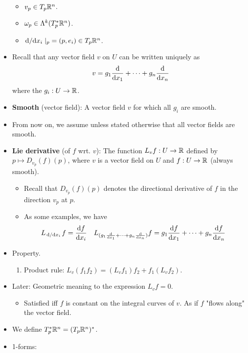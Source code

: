 \documentclass[../notes.tex]{subfiles}
\begin{document}
\begin{itemize}
\begin{itemize}
\begin{itemize}
        \end{itemize}
        \item $v_p\in T_p\R^n$.
        \item $\omega_p\in\lam[k]{T_p^*\R^n}$.
        \item $\dv*{x_i}|_p=(p,e_i)\in T_p\R^n$.
    \end{itemize}
    \item Recall that any vector field $v$ on $U$ can be written uniquely as
    \begin{equation*}
        v = g_1\dv{x_1}+\cdots+g_n\dv{x_n}
    \end{equation*}
    where the $g_i:U\to\R$.
    \item \textbf{Smooth} (vector field): A vector field $v$ for which all $g_i$ are smooth.
    \item From now on, we assume unless stated otherwise that all vector fields are smooth.
    \item \textbf{Lie derivative} (of $f$ wrt. $v$): The function $L_vf:U\to\R$ defined by $p\mapsto D_{v_p}(f)(p)$, where $v$ is a vector field on $U$ and $f:U\to\R$ (always smooth).
    \begin{itemize}
        \item Recall that $D_{v_p}(f)(p)$ denotes the directional derivative of $f$ in the direction $v_p$ at $p$.
        \item As some examples, we have
        \begin{align*}
            L_{\dv*{x_i}}f &= \dv{f}{x_i}&
            L_{(g_1\dv{x_1}+\cdots+g_n\dv{x_n})}f &= g_1\dv{f}{x_1}+\cdots+g_n\dv{f}{x_n}
        \end{align*}
    \end{itemize}
    \item Property.
    \begin{enumerate}
        \item Product rule: $L_v(f_1f_2)=(L_vf_1)f_2+f_1(L_vf_2)$.
    \end{enumerate}
    \item Later: Geometric meaning to the expression $L_vf=0$.
    \begin{itemize}
        \item Satisfied iff $f$ is constant on the integral curves of $v$. As if $f$ "flows along" the vector field.
    \end{itemize}
    \item We define $T_p^*\R^n=(T_p\R^n)^*$.
    \item 1-forms:
    \begin{itemize}

\end{itemize}
\end{itemize}
\end{document}
